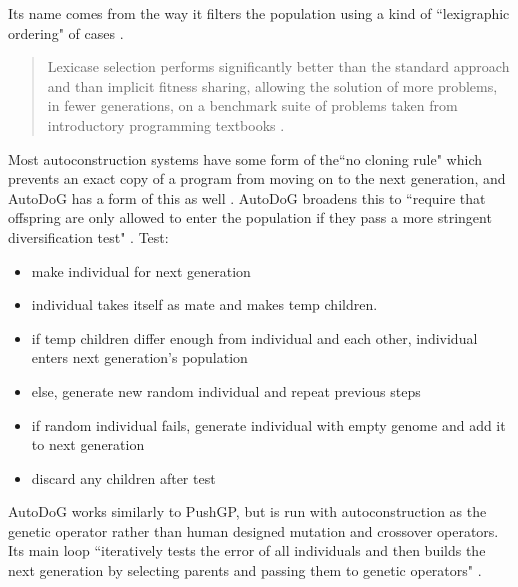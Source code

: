 \documentclass{sig-alternate}
\begin{document}
Its name comes from the way it filters the population using a kind of ``lexigraphic ordering" of cases \cite{spector:2016}.
\begin{quotation}
	Lexicase selection performs significantly better than the standard approach and than implicit fitness sharing, allowing the solution of more problems, in fewer generations, on a benchmark suite of problems taken from introductory programming textbooks \cite{spector:2016}.
\end{quotation}

Most autoconstruction systems have some form of the``no cloning rule" which prevents an exact copy of a program from moving on to the next generation, and AutoDoG has a form of this as well \cite{spector:2016}. AutoDoG broadens this to ``require that offspring are only allowed to enter the population if they pass a more stringent diversification test" \cite{spector:2016}.
Test:
\begin{itemize}
	\item make individual for next generation
	\item individual takes itself as mate and makes temp children.
	\item if temp children differ enough from individual and each other, individual enters next generation's population
	\item else, generate new random individual and repeat previous steps
	\item if random individual fails, generate individual with empty genome and add it to next generation
	\item discard any children after test
\end{itemize}

AutoDoG works similarly to PushGP, but is run with autoconstruction as the genetic operator rather than human designed mutation and crossover operators. Its main loop ``iteratively tests the error of all individuals and then builds the next generation by selecting parents and passing them to genetic operators" \cite{spector:2016}.

\end{document}
